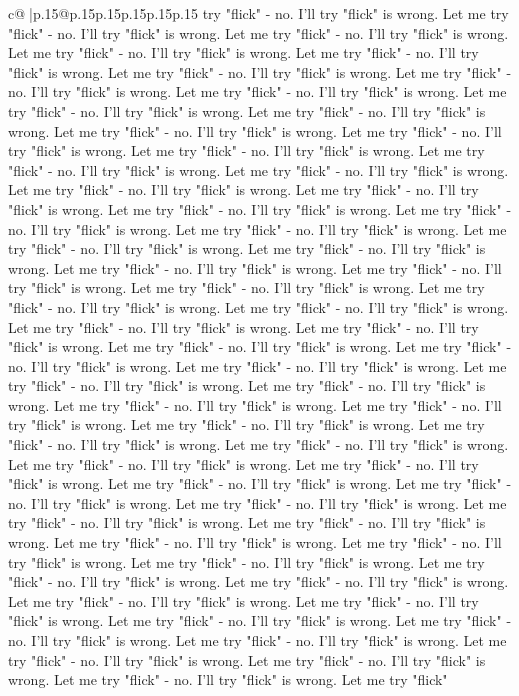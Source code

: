 \documentclass{article}
\begin{document}
{\begin{supertabular}{c@{$\;$}|p{.15\linewidth}@{}p{.15\linewidth}p{.15\linewidth}p{.15\linewidth}p{.15\linewidth}p{.15\linewidth}}
{{{try "flick" {-} no. I'll try "flick" is wrong. Let me try "flick" {-} no. I'll try "flick" is wrong. Let me try "flick" {-} no. I'll try "flick" is wrong. Let me try "flick" {-} no. I'll try "flick" is wrong. Let me try "flick" {-} no. I'll try "flick" is wrong. Let me try "flick" {-} no. I'll try "flick" is wrong. Let me try "flick" {-} no. I'll try "flick" is wrong. Let me try "flick" {-} no. I'll try "flick" is wrong. Let me try "flick" {-} no. I'll try "flick" is wrong. Let me try "flick" {-} no. I'll try "flick" is wrong. Let me try "flick" {-} no. I'll try "flick" is wrong. Let me try "flick" {-} no. I'll try "flick" is wrong. Let me try "flick" {-} no. I'll try "flick" is wrong. Let me try "flick" {-} no. I'll try "flick" is wrong. Let me try "flick" {-} no. I'll try "flick" is wrong. Let me try "flick" {-} no. I'll try "flick" is wrong. Let me try "flick" {-} no. I'll try "flick" is wrong. Let me try "flick" {-} no. I'll try "flick" is wrong. Let me try "flick" {-} no. I'll try "flick" is wrong. Let me try "flick" {-} no. I'll try "flick" is wrong. Let me try "flick" {-} no. I'll try "flick" is wrong. Let me try "flick" {-} no. I'll try "flick" is wrong. Let me try "flick" {-} no. I'll try "flick" is wrong. Let me try "flick" {-} no. I'll try "flick" is wrong. Let me try "flick" {-} no. I'll try "flick" is wrong. Let me try "flick" {-} no. I'll try "flick" is wrong. Let me try "flick" {-} no. I'll try "flick" is wrong. Let me try "flick" {-} no. I'll try "flick" is wrong. Let me try "flick" {-} no. I'll try "flick" is wrong. Let me try "flick" {-} no. I'll try "flick" is wrong. Let me try "flick" {-} no. I'll try "flick" is wrong. Let me try "flick" {-} no. I'll try "flick" is wrong. Let me try "flick" {-} no. I'll try "flick" is wrong. Let me try "flick" {-} no. I'll try "flick" is wrong. Let me try "flick" {-} no. I'll try "flick" is wrong. Let me try "flick" {-} no. I'll try "flick" is wrong. Let me try "flick" {-} no. I'll try "flick" is wrong. Let me try "flick" {-} no. I'll try "flick" is wrong. Let me try "flick" {-} no. I'll try "flick" is wrong. Let me try "flick" {-} no. I'll try "flick" is wrong. Let me try "flick" {-} no. I'll try "flick" is wrong. Let me try "flick" {-} no. I'll try "flick" is wrong. Let me try "flick" {-} no. I'll try "flick" is wrong. Let me try "flick" {-} no. I'll try "flick" is wrong. Let me try "flick" {-} no. I'll try "flick" is wrong. Let me try "flick" {-} no. I'll try "flick" is wrong. Let me try "flick" {-} no. I'll try "flick" is wrong. Let me try "flick" {-} no. I'll try "flick" is wrong. Let me try "flick" {-} no. I'll try "flick" is wrong. Let me try "flick" {-} no. I'll try "flick" is wrong. Let me try "flick" {-} no. I'll try "flick" is wrong. Let me try "flick" {-} no. I'll try "flick" is wrong. Let me try "flick" {-} no. I'll try "flick" is wrong. Let me try "flick" {-} no. I'll try "flick" is wrong. Let me try "flick" {-} no. I'll try "flick" is wrong. Let me try "flick" {-} no. I'll try "flick" is wrong. Let me try "flick" {-} no. I'll try "flick" is wrong. Let me try "flick" {-} no. I'll try "flick" is wrong. Let me try "flick" {-} no. I'll try "flick" is wrong. Let me try "flick" }}}
\end{supertabular}}
\end{document}
